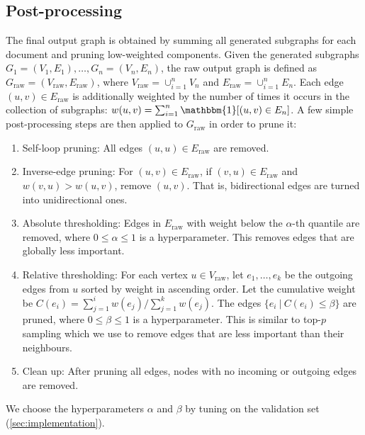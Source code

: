 \documentclass{article}
\begin{document}
\subsection{Post-processing}  \label{sec:method:post-processing}

The final output graph is obtained by summing all generated subgraphs for each document and pruning low-weighted components. Given the generated subgraphs $G_1 = (V_1, E_1), \dots, G_n = (V_n, E_n)$, the raw output graph is defined as $G_\text{raw} = (V_\text{raw}, E_\text{raw})$, where $V_\text{raw} = \cup_{i=1}^n V_n$ and $E_\text{raw} = \cup_{i=1}^n E_n$. Each edge $(u, v) \in E_\text{raw}$ is additionally weighted by the number of times it occurs in the collection of subgraphs: $w(u, v) = \sum_{i=1}^n \mathbbm{1}[(u,v) \in E_n]$. A few simple post-processing steps are then applied to $G_\text{raw}$ in order to prune it:
\begin{enumerate}[itemsep=-2pt,leftmargin=*]
    \item Self-loop pruning: All edges $(u, u) \in E_\text{raw}$ are removed.
    \item Inverse-edge pruning: For $(u, v) \in E_\text{raw}$, if $(v, u) \in E_\text{raw}$ and $w(v, u) > w(u, v)$, remove $(u, v)$. That is, bidirectional edges are turned into unidirectional ones.
    \item Absolute thresholding: Edges in $E_\text{raw}$ with weight below the $\alpha$-th quantile are removed, where $0 \leq \alpha \leq 1$ is a hyperparameter. This removes edges that are globally less important.
    \item Relative thresholding: For each vertex $u \in V_\text{raw}$, let $e_1, \dots, e_k$ be the outgoing edges from $u$ sorted by weight in ascending order. Let the cumulative weight be $C(e_i) = \sum_{j=1}^i w(e_j) / \sum_{j=1}^k w(e_j)$. The edges $\{e_i\ |\ C(e_i) \leq \beta\}$ are pruned, where $0 \leq \beta \leq 1$ is a hyperparameter. This is similar to top-$p$ sampling \cite{holtzman2019curious} which we use to remove edges that are less important than their neighbours.
    \item Clean up: After pruning all edges, nodes with no incoming or outgoing edges are removed.
\end{enumerate}
We choose the hyperparameters $\alpha$ and $\beta$ by tuning on the validation set (\cref{sec:implementation}).
\end{document}

